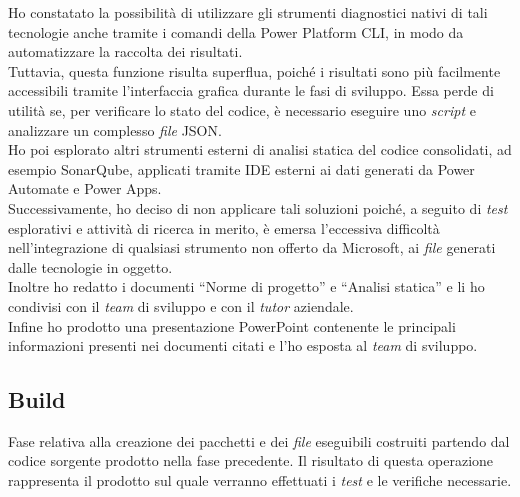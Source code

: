 Ho constatato la possibilità di utilizzare gli strumenti diagnostici nativi di tali tecnologie anche tramite i comandi della Power Platform CLI, in modo da automatizzare la raccolta dei risultati.\\ 
Tuttavia, questa funzione risulta superflua, poiché i risultati sono più facilmente accessibili tramite l'interfaccia grafica durante le fasi di sviluppo.
Essa perde di utilità se, per verificare lo stato del codice, è necessario eseguire uno \emph{script} e analizzare un complesso \emph{file} JSON.\\ 
Ho poi esplorato altri strumenti esterni di analisi statica del codice consolidati, ad esempio SonarQube, applicati tramite IDE esterni ai dati generati da Power Automate e Power Apps.\\
Successivamente, ho deciso di non applicare tali soluzioni poiché, a seguito di \emph{test} esplorativi e attività di ricerca in merito, è emersa l'eccessiva difficoltà nell'integrazione di qualsiasi strumento non offerto da Microsoft, ai \emph{file} generati dalle tecnologie in oggetto.\\ 
Inoltre ho redatto i documenti “Norme di progetto” e “Analisi statica” e li ho condivisi con il \emph{team} di sviluppo e con il \emph{\emph{tutor}} aziendale.\\  
Infine ho prodotto una presentazione PowerPoint contenente le principali informazioni presenti nei documenti citati e l'ho esposta al \emph{team} di sviluppo.\\


\subsection{Build}
Fase relativa alla creazione dei pacchetti e dei \emph{file} eseguibili costruiti partendo dal codice sorgente prodotto nella fase precedente.
Il risultato di questa operazione rappresenta il prodotto sul quale verranno effettuati i \emph{test} e le verifiche necessarie.\\

